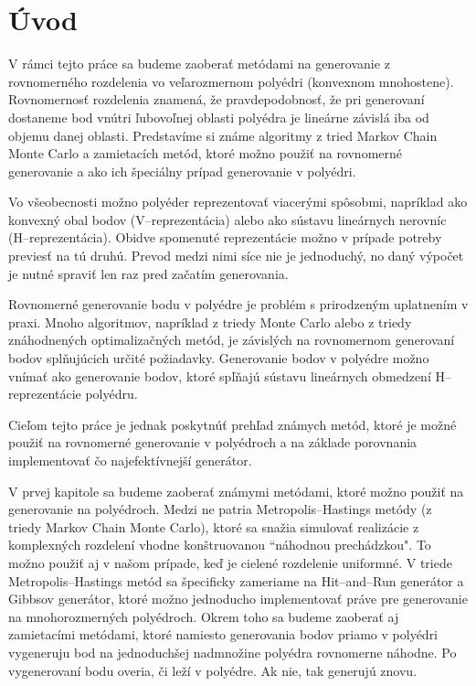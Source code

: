 \chapter*{Úvod} %

V rámci tejto práce sa budeme zaoberať metódami na generovanie z rovnomerného rozdelenia vo veľarozmernom polyédri (konvexnom mnohostene). Rovnomernosť rozdelenia znamená, že pravdepodobnosť, že pri generovaní dostaneme bod vnútri ľubovoľnej oblasti polyédra je lineárne závislá iba od objemu danej oblasti. Predstavíme si známe algoritmy z tried Markov Chain Monte Carlo a zamietacích metód, ktoré možno použiť na rovnomerné generovanie a ako ich špeciálny prípad generovanie v polyédri. 

Vo všeobecnosti možno polyéder reprezentovať viacerými spôsobmi, napríklad ako konvexný obal bodov (V--reprezentácia) alebo ako sústavu lineárnych nerovníc (H--reprezentácia). Obidve spomenuté reprezentácie možno v prípade potreby previesť na tú druhú. Prevod medzi nimi síce nie je jednoduchý, no daný výpočet je nutné spraviť len raz pred začatím generovania. 

Rovnomerné generovanie bodu v polyédre je problém s prirodzeným uplatnením v praxi. Mnoho algoritmov, napríklad z triedy Monte Carlo alebo z triedy znáhodnených optimalizačných metód, je závislých na rovnomernom generovaní bodov splňujúcich určité požiadavky.
Generovanie bodov v polyédre možno vnímať ako generovanie bodov, ktoré spľňajú sústavu lineárnych obmedzení H--reprezentácie polyédru.

Cieľom tejto práce je jednak poskytnúť prehľad známych metód, ktoré je možné použiť na rovnomerné generovanie v polyédroch a na základe porovnania implementovať čo najefektívnejší generátor.

V prvej kapitole sa budeme zaoberať známymi metódami, ktoré možno použiť na generovanie na polyédroch. Medzi ne patria Metropolis--Hastings metódy (z triedy Markov Chain Monte Carlo), ktoré sa snažia simulovať realizácie z komplexných rozdelení vhodne konštruovanou ``náhodnou prechádzkou". To možno použiť aj v našom prípade, keď je cielené rozdelenie uniformné. V triede Metropolis--Hastings metód sa špecificky zameriame na Hit--and--Run generátor a Gibbsov generátor, ktoré možno jednoducho implementovať práve pre generovanie na mnohorozmerných polyédroch.
Okrem toho sa budeme zaoberať aj zamietacími metódami, ktoré namiesto generovania bodov priamo v polyédri vygeneruju bod na jednoduchšej nadmnožine polyédra rovnomerne náhodne. Po vygenerovaní bodu overia, či leží v polyédre. Ak nie, tak generujú znovu.

